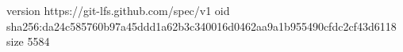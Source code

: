 version https://git-lfs.github.com/spec/v1
oid sha256:da24c585760b97a45ddd1a62b3c340016d0462aa9a1b955490cfdc2cf43d6118
size 5584
